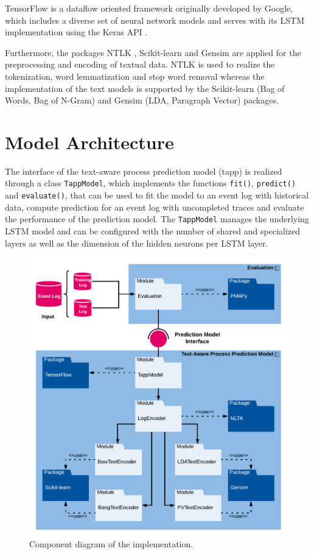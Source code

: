 TensorFlow \cite{DBLP:journals/corr/AbadiABBCCCDDDG16} is a dataflow oriented framework originally developed by Google, which includes a diverse set of neural network models and serves with its LSTM implementation using the Keras API \cite{chollet2015keras}.

Furthermore, the packages NTLK \cite{DBLP:books/daglib/0022921}, Scikit-learn \cite{DBLP:journals/jmlr/PedregosaVGMTGBPWDVPCBPD11} and Gensim \cite{rehurek_lrec} are applied for the preprocessing and encoding of textual data.
NTLK is used to realize the tokenization, word lemmatization and stop word removal whereas the implementation of the text models is supported by the Scikit-learn (Bag of Words, Bag of N-Gram) and Gensim (LDA, Paragraph Vector) packages.


\section{Model Architecture}\label{sec:model-implementation}

The interface of the text-aware process prediction model (tapp) is realized through a class \texttt{TappModel}, which implements the functions \texttt{fit()},  \texttt{predict()} and  \texttt{evaluate()}, that can be used to fit the model to an event log with historical data, compute prediction for an event log with uncompleted traces and evaluate the performance of the prediction model.
The \texttt{TappModel} manages the underlying LSTM model and can be configured with the number of shared and specialized layers as well as the dimension of the hidden neurons per LSTM layer.

\begin{figure}[htbp!]
	\centering
	\includegraphics[width=\textwidth]{figures/implementation}
	\caption[Component diagram of the implementation]{Component diagram of the implementation.}
	\label{fig:/implementation}
\end{figure}

